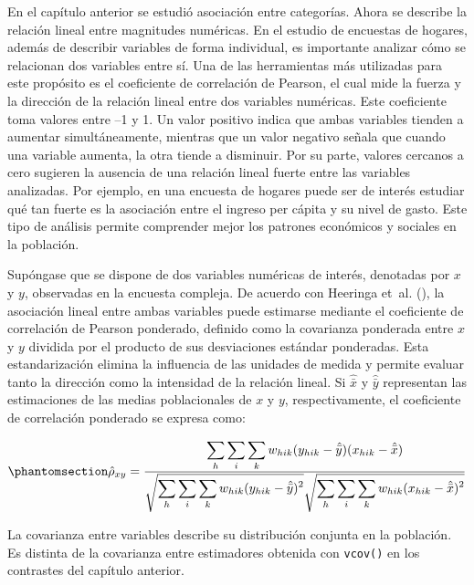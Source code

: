 \documentclass[
  spanish,
  11pt,
  letterpaper,
  oneside,
  open=any]{scrbook}
\begin{document}
En el capítulo anterior se estudió asociación entre categorías. Ahora se
describe la relación lineal entre magnitudes numéricas. En el estudio de
encuestas de hogares, además de describir variables de forma individual,
es importante analizar cómo se relacionan dos variables entre sí. Una de
las herramientas más utilizadas para este propósito es el coeficiente de
correlación de Pearson, el cual mide la fuerza y la dirección de la
relación lineal entre dos variables numéricas. Este coeficiente toma
valores entre --1 y 1. Un valor positivo indica que ambas variables
tienden a aumentar simultáneamente, mientras que un valor negativo
señala que cuando una variable aumenta, la otra tiende a disminuir. Por
su parte, valores cercanos a cero sugieren la ausencia de una relación
lineal fuerte entre las variables analizadas. Por ejemplo, en una
encuesta de hogares puede ser de interés estudiar qué tan fuerte es la
asociación entre el ingreso per cápita y su nivel de gasto. Este tipo de
análisis permite comprender mejor los patrones económicos y sociales en
la población.

Supóngase que se dispone de dos variables numéricas de interés,
denotadas por \(x\) y \(y\), observadas en la encuesta compleja. De
acuerdo con Heeringa et~al.
(), la asociación lineal
entre ambas variables puede estimarse mediante el coeficiente de
correlación de Pearson ponderado, definido como la covarianza ponderada
entre \(x\) y \(y\) dividida por el producto de sus desviaciones
estándar ponderadas. Esta estandarización elimina la influencia de las
unidades de medida y permite evaluar tanto la dirección como la
intensidad de la relación lineal. Si \(\hat{\bar{x}}\) y
\(\hat{\bar{y}}\) representan las estimaciones de las medias
poblacionales de \(x\) y \(y\), respectivamente, el coeficiente de
correlación ponderado se expresa como:

\begin{equation}\protect\phantomsection\label{eq-correlacion-ponderada}{
\hat{\rho}_{xy} = \frac{\displaystyle \sum_{h} \sum_{i} \sum_{k} w_{hik} (y_{hik} - \hat{\bar{y}})(x_{hik} - \hat{\bar{x}})} {\sqrt{\displaystyle \sum_{h} \sum_{i} \sum_{k} w_{hik} (y_{hik} - \hat{\bar{y}})^2} \sqrt{\displaystyle \sum_{h} \sum_{i} \sum_{k} w_{hik} (x_{hik} - \hat{\bar{x}})^2}}
}\end{equation}

La covarianza entre variables describe su distribución conjunta en la
población. Es distinta de la covarianza entre estimadores obtenida con
\texttt{vcov()} en los contrastes del capítulo anterior.
\end{document}
